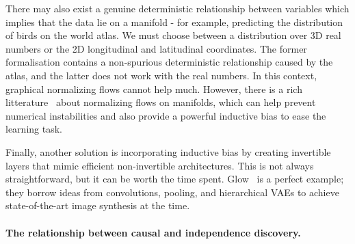 There may also exist a genuine deterministic relationship between variables which implies that the data lie on a manifold - for example, predicting the distribution of birds on the world atlas. We must choose between a distribution over 3D real numbers or the 2D longitudinal and latitudinal coordinates. The former formalisation contains a non-spurious deterministic relationship caused by the atlas, and the latter does not work with the real numbers. In this context, graphical normalizing flows cannot help much. However, there is a rich litterature~\citep{kohler2021smooth, mathieu2020riemannian, gemici2016normalizing, kalatzis2021multi, rezende2020normalizing} about normalizing flows on manifolds, which can help prevent numerical instabilities and also provide a powerful inductive bias to ease the learning task.

Finally, another solution is incorporating inductive bias by creating invertible layers that mimic efficient non-invertible architectures. This is not always straightforward, but it can be worth the time spent. Glow~\citep{kingma_glow_2018} is a perfect example; they borrow ideas from convolutions, pooling, and hierarchical VAEs to achieve state-of-the-art image synthesis at the time.  


\paragraph{The relationship between causal and independence discovery.}

